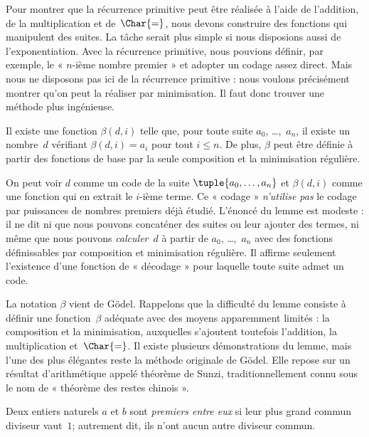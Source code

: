 \documentclass[../../../include/open-logic-section]{subfiles}
\begin{document}

Pour montrer que la récurrence primitive peut être réalisée à
l'aide de l'addition, de la multiplication et de~$\Char{=}$,
nous devons construire des fonctions qui manipulent des suites.
La tâche serait plus simple si nous disposions aussi de
l'exponentiation. Avec la récurrence primitive, nous pouvions
définir, par exemple, le « $n$-ième nombre premier » et adopter
un codage assez direct. Mais nous ne disposons pas ici de la
récurrence primitive : nous voulons précisément montrer qu'on
peut la réaliser par minimisation. Il faut donc trouver une
méthode plus ingénieuse.

\begin{lem}
Il existe une fonction $\beta(d,i)$ telle que, pour toute suite
$a_0$, \dots,~$a_n$, il existe un nombre~$d$ vérifiant
$\beta(d,i)=a_i$ pour tout $i\le n$. De plus, $\beta$ peut être
définie à partir des fonctions de base par la seule composition
et la minimisation régulière.
\end{lem}

On peut voir $d$ comme un code de la suite
$\tuple{a_0,\dots,a_n}$ et $\beta(d,i)$ comme une fonction qui en
extrait le $i$-ième terme. Ce « codage » \emph{n'utilise pas} le
codage par puissances de nombres premiers déjà étudié. L'énoncé
du lemme est modeste : il ne dit ni que nous pouvons concaténer
des suites ou leur ajouter des termes, ni même que nous pouvons
\emph{calculer}~$d$ à partir de $a_0$, \dots,~$a_n$ avec des
fonctions définissables par composition et minimisation régulière.
Il affirme seulement l'existence d'une fonction de « décodage »
pour laquelle toute suite admet un code.

La notation $\beta$ vient de G\"odel. Rappelons que la difficulté
du lemme consiste à définir une fonction~$\beta$ adéquate avec
des moyens apparemment limités : la composition et la
minimisation, auxquelles s'ajoutent toutefois l'addition, la
multiplication et~$\Char{=}$. Il existe plusieurs démonstrations
du lemme, mais l'une des plus élégantes reste la méthode
originale de G\"odel. Elle repose sur un résultat d'arithmétique
appelé théorème de Sunzi, traditionnellement connu sous le nom
de « théorème des restes chinois ».

\begin{defn}
Deux entiers naturels $a$ et $b$ sont \emph{premiers entre eux} si
leur plus grand commun diviseur vaut~$1$; autrement dit, ils
n'ont aucun autre diviseur commun.
\end{defn}
\end{document}
